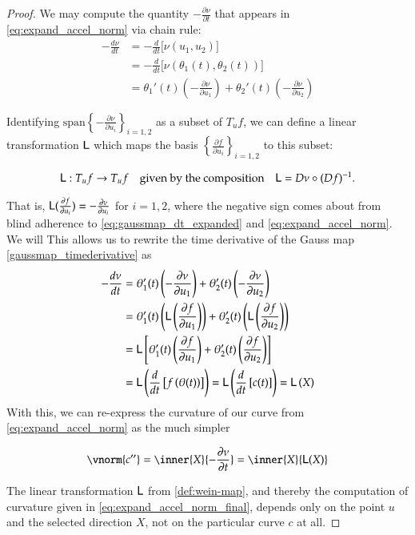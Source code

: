 \begin{proof}
	We may compute the quantity $-\frac{\partial \nu}{\partial t}$ that appears in
	\cref{eq:expand_accel_norm} via chain rule:
	\begin{align} \label{gaussmap_timederivative}
	-\frac{d \nu}{dt} &= -\frac{d}{dt}\big[\nu(u_1, u_2)\big] \\
	&= -\frac{d}{dt}\big[\nu(\theta_1(t), \theta_2(t))\big] \\
	&= \theta_1'(t)\left( - \frac{\partial \nu}{\partial u_1} \right) + 
	\theta_2'(t)\left( - \frac{\partial \nu}{\partial u_2} \right) \label{eq:gaussmap_dt_expanded}
	\end{align}
	
	
	Identifying $\textrm{span}\left\{ - \frac{\partial \nu}{\partial u_i}\right\}_{i=1,2}$ as a subset of $T_u f$,  we can define a linear transformation $\mathsf{L}$ which maps the basis
	$\left\{ \frac{\partial f}{\partial u_i}\right\}_{i=1,2}$ to this subset:
	
	\begin{defn} \label{def:wein-map}
		\[
		\mathsf{L}: T_u f \to T_u f 
		\quad \textrm{given by the composition} \quad
		\mathsf{L} = D\nu \circ (Df)^{-1}.
		\]
	\end{defn}
	That is, $\mathsf{L}(\frac{\partial f}{\partial u_i}) = - \frac{\partial \nu}{\partial u_i} $ for $i=1,2$, where the negative sign comes about from blind adherence to \cref{eq:gaussmap_dt_expanded} and \cref{eq:expand_accel_norm}. We will This allows us to rewrite the time derivative of the Gauss map \cref{gaussmap_timederivative} as
		\begin{align}
		-\frac{d \nu}{dt} &= 
		\theta_1'(t)\left( - \frac{\partial \nu}{\partial u_1} \right) + 
		\theta_2'(t)\left( - \frac{\partial \nu}{\partial u_2} \right) \\
		&= \theta_1'(t)\left( \mathsf{L}\left(\frac{\partial f}{\partial u_1}\right) \right) + 
		\theta_2'(t)\left( \mathsf{L}\left(\frac{\partial f}{\partial u_2}\right) \right) \\
		&= \mathsf{L}\left[\theta_1'(t)\left( \frac{\partial f}{\partial u_1}\right)  + 
		\theta_2'(t)\left( \frac{\partial f}{\partial u_2} \right)\right] \\
		&= \mathsf{L}\left(\frac{d}{dt}\left[ f\left(\theta(t)\right)\right] \right)
		= \mathsf{L}\left( \frac{d}{dt} \left[ c(t) \right] \right) = \mathsf{L}\left(X\right)
		\end{align} 
		With this, we can re-express the curvature of our curve from
		\cref{eq:expand_accel_norm} as the much simpler
		
		\begin{equation} \label{eq:expand_accel_norm_final}
		\vnorm{c''} = \inner{X}{-\frac{\partial \nu}{\partial t}} = \inner{X}{\wein(X)}
		\end{equation}
		
	
	The linear transformation $\mathsf{L}$ from \cref{def:wein-map}, and thereby
	the computation of curvature given in \cref{eq:expand_accel_norm_final},
	depends only on the point $u$ and the selected direction $X$, not on the particular curve $c$ at all.
	\end{proof}
